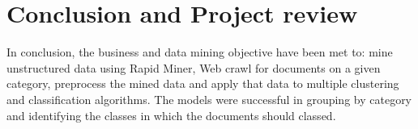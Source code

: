 \section*{Conclusion and Project review}
In conclusion, the business and data mining objective have been met to: mine unstructured data using Rapid Miner, Web crawl for documents on a given category, preprocess the mined data and apply that data to multiple clustering and classification algorithms. 
The models were successful in grouping by category and identifying the classes in which the documents should classed. 


